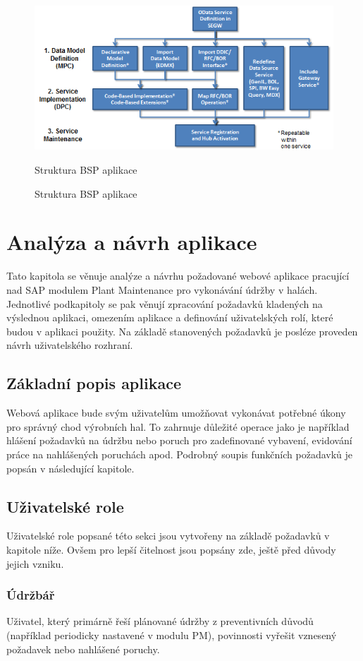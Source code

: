 \documentclass[thesis=M,czech]{FITthesis}[2012/06/26]
\begin{document}
\begin{figure}[H]
	\centering
	\includegraphics[width=1\textwidth]{images/odata.png}
	\caption{Struktura BSP aplikace}
	\label{img:bsp}
	\small
	Struktura BSP aplikace
\end{figure}

\chapter{Analýza a návrh aplikace}
Tato kapitola se věnuje analýze a návrhu požadované webové aplikace pracující nad SAP modulem Plant Maintenance pro vykonávání údržby v halách. Jednotlivé podkapitoly se pak věnují zpracování požadavků kladených na výslednou aplikaci, omezením aplikace a definování uživatelských rolí, které budou v aplikaci použity. Na základě stanovených požadavků je posléze proveden návrh uživatelského rozhraní.  


\section{Základní popis aplikace}
Webová aplikace bude svým uživatelům umožňovat vykonávat potřebné úkony pro správný chod výrobních hal. To zahrnuje důležité operace jako je například hlášení požadavků na údržbu nebo poruch pro zadefinované vybavení, evidování práce na nahlášených poruchách apod. Podrobný soupis funkčních požadavků je popsán v následující kapitole. 


\section{Uživatelské role}
Uživatelské role popsané této sekci jsou vytvořeny na základě požadavků v kapitole níže. Ovšem pro lepší čitelnost jsou popsány zde, ještě před důvody jejich vzniku. 
\subsection{Údržbář}
Uživatel, který primárně řeší plánované údržby z preventivních důvodů (například periodicky nastavené v modulu PM), povinnosti vyřešit vznesený požadavek nebo nahlášené poruchy.
\end{document}
